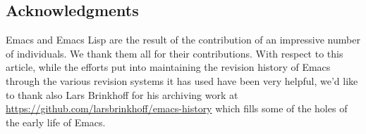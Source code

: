 \documentclass[format=acmsmall, review]{acmart}
\newcommand \Elisp {Emacs Lisp}
\begin{document}
\subsection{Acknowledgments}

Emacs and \Elisp{} are the result of the contribution of an impressive
number of individuals.  We thank them all for their contributions.
With respect to this article, while the efforts put into maintaining the
revision history of Emacs through the various revision systems it has used
have been very helpful, we'd like to thank also Lars Brinkhoff for his
archiving work at \url{https://github.com/larsbrinkhoff/emacs-history} which
fills some of the holes of the early life of Emacs.



\end{document}
